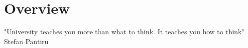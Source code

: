 




\part{Overview}
  "University teaches you more than what to think. It teaches you how to think" Stefan Pantiru
  
  

  
  

  





